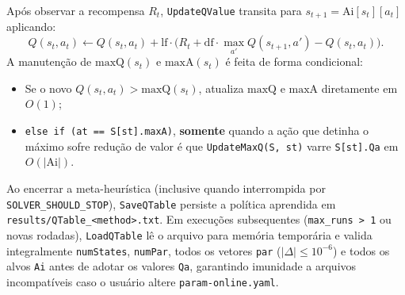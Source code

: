 \documentclass[11pt,a4paper]{article}
\begin{document}
Após observar a recompensa $R_t$, \texttt{UpdateQValue} transita para $s_{t+1} = \text{Ai}[s_t][a_t]$ aplicando:
\begin{equation}
  Q(s_t, a_t) \leftarrow Q(s_t, a_t) + \text{lf} \cdot \Big(R_t + \text{df} \cdot \max_{a'} Q(s_{t+1}, a') - Q(s_t, a_t)\Big).
  \label{eq:bellman}
\end{equation}
A manutenção de $\text{maxQ}(s_t)$ e $\text{maxA}(s_t)$ é feita de forma condicional:
\begin{itemize}[leftmargin=*]
  \item Se o novo $Q(s_t, a_t) > \text{maxQ}(s_t)$, atualiza $\text{maxQ}$ e $\text{maxA}$ diretamente em $O(1)$;
  \item \texttt{else if (at == S[st].maxA)}, \textbf{somente} quando a ação que detinha o máximo sofre redução de valor é que \texttt{UpdateMaxQ(S, st)} varre \texttt{S[st].Qa} em $O(|\text{Ai}|)$.
\end{itemize}

Ao encerrar a meta-heurística (inclusive quando interrompida por \texttt{SOLVER\_SHOULD\_STOP}), \texttt{SaveQTable} persiste a política aprendida em \texttt{results/QTable\_<method>.txt}. Em execuções subsequentes (\texttt{max\_runs > 1} ou novas rodadas), \texttt{LoadQTable} lê o arquivo para memória temporária e valida integralmente \texttt{numStates}, \texttt{numPar}, todos os vetores \texttt{par} ($|\Delta| \le 10^{-6}$) e todos os alvos \texttt{Ai} antes de adotar os valores \texttt{Qa}, garantindo imunidade a arquivos incompatíveis caso o usuário altere \texttt{param-online.yaml}.
\end{document}

